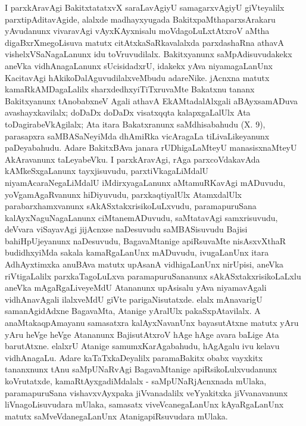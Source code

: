 I parxkAravAgi BakitxtatatxvX saraLavAgiyU samagarxvAgiyU giVteyalilx parxti\-pAdita\-vAgide, alalxde madhayxyugada BakitxpaMthaparxsArakaru yAvudanunx vivaravAgi vAyxKAyxni\-salu moVdagoLuLxtAtxroV aMtha digaBxrXmegoLisuva matutx citAtxkaSaRkavalalxda parxdashaRna athavA vishelxVSaNagaLanunx idu toVruvudilalx. Bakitxyanunx saMpAdisuvudakekx aneVka vidhAnagaLanunx sUcisidadxrU, idakekx yAva niyamagaLanUnx KacitavAgi hAki\-koDa\-lAguvudilalxveMbudu adareNike. jAcnxna matutx kamaRkAMDagaLalilx sharxdedhxyiTiTxruvaMte Bakatxnu tananx Bakitxyanunx tAnobabxneV Agali athavA EkAMtadalAlxgali aBAyxsamADuva avashayxkavilalx; doDaDx doDaDx visatxqqta kalapxgaLalUlx Ata toDagirabeVkAgilalx; Ata itara Bakatxranunx saMdhisabahudu {\rm (X. 9)}, parasapxra saMBASaNeyiMda dhAmiRka vicAragaLa tiLivaLikeyanunx paDeyabahudu. Adare BakitxBAva janara rUDhigaLaMteyU manasisx\-naMteyU AkAravanunx taLeyabeVku. I parxkAravAgi, rAga parxcoVdakavAda kAMkeSx\-gaLanunx tayxjisuvudu, parxtiVkagaLiMdalU niyamAcaraNegaLiMdalU iMdirxyagaLanunx aMtamuRKavAgi mADuvudu, yoVgamAgaRvanunx hiDiyuvudu, parxkaqtiyalUlx AtamxdalUlx parabarxhamxvanunx sAkASxtakxrisikoLuLxvudu, paramapuruSana kalAyxNaguNagaLanunx ciMtanemADuvudu, saMtatavAgi samxrisuvudu, deVvara viSayavAgi jijAcnxse naDesuvudu saMBASisuvudu Bajisi bahiHpUjeyanunx naDesuvudu, BagavaMtanige apiRsuvaMte nisAsxvXthaR budidhxyiMda sakala kamaRgaLanUnx mADuvudu, ivugaLanUnx itara AdhAyxtimxka anuBAva matutx upAsanA vidhigaLanUnx nirUpisi, aneVka riVtigaLalilx parxkaTagoLuLxva paramapuruSananunx sAkASxtakxrisikoLaLxlu aneVka mAgaRgaLiveyeMdU Atananunx upAsisalu yAva niyamavAgali vidhAnavAgali ilalxveMdU giVte parigaNisutatxde. elalx mAnavarigU samanAgidAdxne BagavaMta, Atanige yAralUlx pakaSxpAtavilalx. A anaMtakaqpAmayanu samasatxra kalAyxNavanUnx bayasutAtxne matutx yAru yAru heVge heVge Atananunx BajisutAtxroV hAge hAge avara baLige Ata barutAtxne. elalxrU Atanige samumxKarAgabahudu, hAgAgalu ivu kelavu vidhAnagaLu. Adare kaTaTxkaDeyalilx paramaBakitx obabx vayxkitx tananxnunx tAnu saMpUNaRvAgi BagavaMtanige apiRsikoLulxvudanunx koVrutatxde, kamaRtAyxgadiMdalalx - saMpUNaRjAcnxnada mUlaka, paramapuruSana vishavxvAyxpaka jiVvanadalilx veYyakitxka jiVvanavanunx liVnagoLisuvudara mUlaka, samasatx viveVcanegaLanUnx kAyaRgaLanUnx matutx saMveVdanegaLanUnx AtanigapiRsuvudara mUlaka. 

